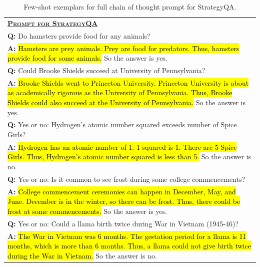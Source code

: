 \documentclass[]{article}
\theoremstyle{plain}
\theoremstyle{definition}
\theoremstyle{remark}
\begin{document}
\begin{table}[H]
    \centering
    \small
    \caption{    
    Few-shot exemplars for full chain of thought prompt for StrategyQA.
    }
    \begin{tabular}{p{\linewidth}}
        \toprule
        \underline{\textbf{\textsc{Prompt for StrategyQA}}} \\
        \vspace{-2mm}
        \textbf{Q:} Do hamsters provide food for any animals? \\
        \vspace{-1mm}
        \textbf{A:} \hl{Hamsters are prey animals. Prey are food for predators. Thus, hamsters provide food for some animals.} So the answer is yes. \\
        \vspace{0mm}
        \textbf{Q:} Could Brooke Shields succeed at University of Pennsylvania? \\
        \vspace{-1mm}
        \textbf{A:} \hl{Brooke Shields went to Princeton University. Princeton University is about as academically rigorous as the University of Pennsylvania. Thus, Brooke Shields could also succeed at the University of Pennsylvania.}  So the answer is yes. \\
        \vspace{0mm}
        \textbf{Q:} Yes or no: Hydrogen's atomic number squared exceeds number of Spice Girls? \\
        \vspace{-1mm}
        \textbf{A:} \hl{Hydrogen has an atomic number of 1. 1 squared is 1. There are 5 Spice Girls. Thus, Hydrogen's atomic number squared is less than 5.} So the answer is no. \\
        \vspace{0mm}
        \textbf{Q:} Yes or no: Is it common to see frost during some college commencements? \\
        \vspace{-1mm}
        \textbf{A:} \hl{College commencement ceremonies can happen in December, May, and June. December is in the winter, so there can be frost. Thus, there could be frost at some commencements.} So the answer is yes. \\
        \vspace{0mm}
        \textbf{Q:} Yes or no: Could a llama birth twice during War in Vietnam (1945-46)? \\
        \vspace{-1mm}
        \textbf{A:} \hl{The War in Vietnam was 6 months. The gestation period for a llama is 11 months, which is more than 6 months. Thus, a llama could not give birth twice during the War in Vietnam.} So the answer is no. \\

\end{tabular}
\end{table}
\end{document}
